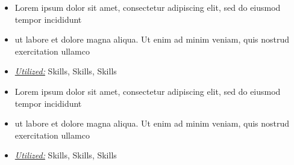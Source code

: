 \documentclass[10pt,a4paper,ragged2e]{altacv}
\begin{document}

\begin{fullwidth}
\makecvheader
\end{fullwidth}





\begin{itemize}
  \item Lorem ipsum dolor sit amet, consectetur adipiscing elit, sed do eiusmod tempor incididunt
  \item ut labore et dolore magna aliqua. Ut enim ad minim veniam, quis nostrud exercitation ullamco
  \item \underline{\textit{Utilized:}} Skills, Skills, Skills
\end{itemize}
\divider\small

\begin{itemize}
  \item Lorem ipsum dolor sit amet, consectetur adipiscing elit, sed do eiusmod tempor incididunt
  \item ut labore et dolore magna aliqua. Ut enim ad minim veniam, quis nostrud exercitation ullamco
  \item \underline{\textit{Utilized:}} Skills, Skills, Skills
\end{itemize}
\divider\small
\end{document}
